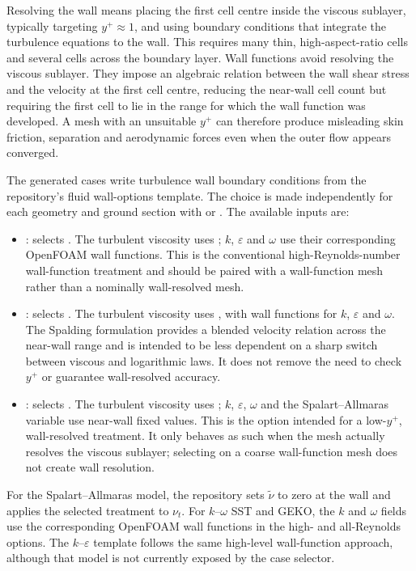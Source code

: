 Resolving the wall means placing the first cell centre inside the viscous sublayer, typically targeting $y^+\approx 1$, and using boundary conditions that integrate the turbulence equations to the wall. This requires many thin, high-aspect-ratio cells and several cells across the boundary layer. Wall functions avoid resolving the viscous sublayer. They impose an algebraic relation between the wall shear stress and the velocity at the first cell centre, reducing the near-wall cell count but requiring the first cell to lie in the range for which the wall function was developed. A mesh with an unsuitable $y^+$ can therefore produce misleading skin friction, separation and aerodynamic forces even when the outer flow appears converged.

The generated cases write turbulence wall boundary conditions from the repository's fluid wall-options template. The choice is made independently for each geometry and ground section with  or . The available inputs are:
\begin{itemize}
    \item {}: selects . The turbulent viscosity uses ; $k$, $\varepsilon$ and $\omega$ use their corresponding OpenFOAM wall functions. This is the conventional high-Reynolds-number wall-function treatment and should be paired with a wall-function mesh rather than a nominally wall-resolved mesh.
    \item {}: selects . The turbulent viscosity uses , with wall functions for $k$, $\varepsilon$ and $\omega$. The Spalding formulation provides a blended velocity relation across the near-wall range and is intended to be less dependent on a sharp switch between viscous and logarithmic laws. It does not remove the need to check $y^+$ or guarantee wall-resolved accuracy.
    \item {}: selects . The turbulent viscosity uses ; $k$, $\varepsilon$, $\omega$ and the Spalart--Allmaras variable use near-wall fixed values. This is the option intended for a low-$y^+$, wall-resolved treatment. It only behaves as such when the mesh actually resolves the viscous sublayer; selecting  on a coarse wall-function mesh does not create wall resolution.
\end{itemize}

For the Spalart--Allmaras model, the repository sets $\widetilde{\nu}$ to zero at the wall and applies the selected treatment to $\nu_t$. For $k$--$\omega$ SST and GEKO, the $k$ and $\omega$ fields use the corresponding OpenFOAM wall functions in the high- and all-Reynolds options. The $k$--$\varepsilon$ template follows the same high-level wall-function approach, although that model is not currently exposed by the case selector.

